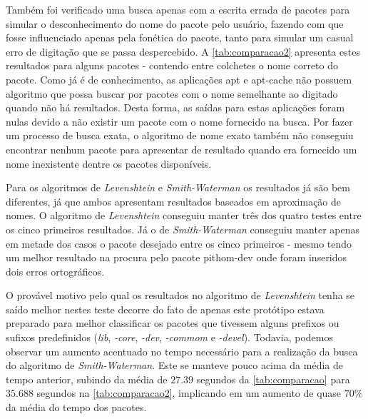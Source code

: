 Também foi verificado uma busca apenas com a escrita errada de pacotes para simular o desconhecimento do nome do pacote pelo usuário, fazendo com que fosse influenciado apenas pela fonética do pacote, tanto para simular um casual erro de digitação que se passa despercebido. A \autoref{tab:comparacao2} apresenta estes resultados para alguns pacotes - contendo entre colchetes o nome correto do pacote. Como já é de conhecimento, as aplicações {\code apt} e {\code apt-cache} não possuem algoritmo que possa buscar por pacotes com o nome semelhante ao digitado quando não há resultados. Desta forma, as saídas para estas aplicações foram nulas devido a não existir um pacote com o nome fornecido na busca. Por fazer um processo de busca exata, o algoritmo de nome exato também não conseguiu encontrar nenhum pacote para apresentar de resultado quando era fornecido um nome inexistente dentre os pacotes disponíveis. 

Para os algoritmos de \textit{Levenshtein} e \textit{Smith-Waterman} os resultados já são bem diferentes, já  que ambos apresentam resultados baseados em aproximação de nomes. O algoritmo de \textit{Levenshtein} conseguiu manter três dos quatro testes entre os cinco primeiros resultados. Já o de \textit{Smith-Waterman} conseguiu manter apenas em metade dos casos o pacote desejado entre os cinco primeiros - mesmo tendo um melhor resultado na procura pelo pacote {\code pithom-dev} onde foram inseridos dois erros ortográficos.

O provável motivo pelo qual os resultados no algoritmo de \textit{Levenshtein} tenha se saído melhor nestes teste decorre do fato de apenas este protótipo estava preparado para melhor classificar os pacotes que tivessem alguns prefixos ou sufixos predefinidos (\textit{lib}, \textit{-core}, \textit{-dev}, \textit{-commom} e \textit{-devel}).
Todavia, podemos observar um aumento acentuado no tempo necessário para a realização da busca do algoritmo de \textit{Smith-Waterman}. Este se manteve pouco acima da média de tempo anterior, subindo da média de $27.39$ segundos da \autoref{tab:comparacao} para  $35.688$ segundos na \autoref{tab:comparacao2}, implicando em um aumento de quase $70\%$ da média do tempo dos pacotes.